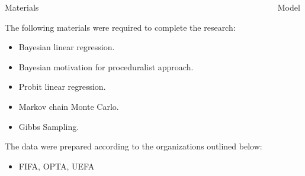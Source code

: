 \documentclass[final]{beamer}
\newlength{\onecolwid}
\newlength{\twocolwid}
\begin{document}
\begin{frame}[t]
\begin{columns}[t]
\begin{column}{\twocolwid}
\begin{columns}[t,totalwidth=\twocolwid]
\begin{column}{\onecolwid}

\begin{block}{Materials}

The following materials were required to complete the research:

\begin{itemize}
\item Bayesian linear regression.
\item Bayesian motivation for proceduralist approach.
\item Probit linear regression.
\item Markov chain Monte Carlo.
\item Gibbs Sampling. 
\end{itemize}

The data were prepared according to the organizations outlined below:

\begin{itemize}
\item FIFA, OPTA, UEFA
\end{itemize}

\end{block}


\end{column} %

\begin{column}{\onecolwid}\vspace{-.6in} %


\begin{block}{Model}


\end{block}
\end{column}
\end{columns}
\end{column}
\end{columns}
\end{frame}
\end{document}
